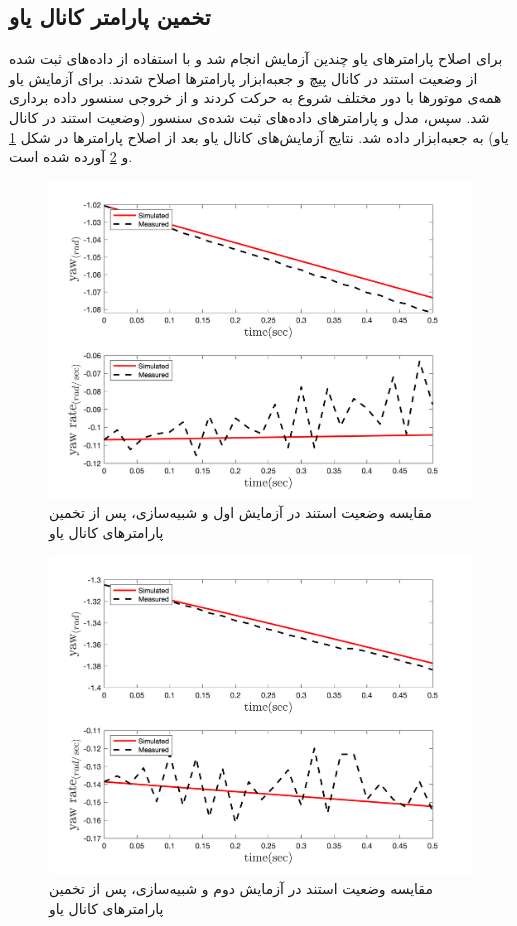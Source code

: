 \subsection{تخمین پارامتر کانال یاو}
برای اصلاح پارامترهای یاو چندین آزمایش انجام شد و با استفاده از داده‌های ثبت شده از وضعیت استند در کانال پیچ  و جعبه‌ابزار
پارامترها اصلاح شدند.
برای آزمایش یاو همه‌ی موتورها با دور مختلف شروع به حرکت کردند و از خروجی‌ سنسور داده برداری شد. سپس، مدل و پارامترهای داده‌های ثبت شده‌ی سنسور (وضعیت استند در کانال یاو) به جعبه‌ابزار
داده شد. نتایج آزمایش‌های کانال یاو بعد از اصلاح پارامترها در شکل
\ref{yaw_ps1} و \ref{yaw_ps2}
آورده شده است.

\begin{figure}[H]
	\includegraphics[width=12cm]{../Figures/RCP/yaw_parameter_estimation/RCP_yaw_S1.png}
	\centering
	\caption{مقايسه وضعیت استند در  آزمايش اول و شبیه‌سازی، پس از تخمین پارامترهای کانال یاو}
	\label{yaw_ps1}
\end{figure}

\begin{figure}[H]
	\includegraphics[width=12cm]{../Figures/RCP/yaw_parameter_estimation/RCP_yaw_S2.png}
	\centering
	\caption{مقايسه وضعیت استند در  آزمايش دوم و شبیه‌سازی، پس از تخمین پارامترهای کانال یاو}
	\label{yaw_ps2}
\end{figure}